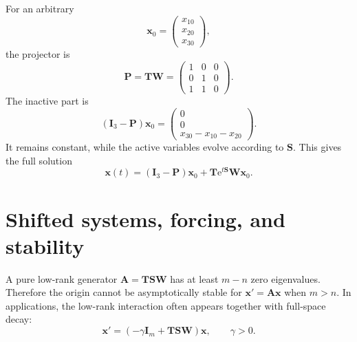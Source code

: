 \documentclass[11pt]{article}
\newcommand{\I}{\mathbf{I}}
\newcommand{\mat}[1]{\mathbf{#1}}
\newcommand{\vect}[1]{\mathbf{#1}}
\newcommand{\e}{\mathrm{e}}
\theoremstyle{definition}
\theoremstyle{remark}
\begin{document}
For an arbitrary
\[
  \vect{x}_0=
  \begin{pmatrix}x_{10}\\x_{20}\\x_{30}\end{pmatrix},
\]
the projector is
\begin{equation}
  \mat{P}=\mat{T}\mat{W}
  =
  \begin{pmatrix}
    1&0&0\\
    0&1&0\\
    1&1&0
  \end{pmatrix}.
  \label{eq:ode-example-P}
\end{equation}
The inactive part is
\begin{equation}
  (\I_3-\mat{P})\vect{x}_0
  =
  \begin{pmatrix}
    0\\0\\x_{30}-x_{10}-x_{20}
  \end{pmatrix}.
  \label{eq:ode-example-inactive}
\end{equation}
It remains constant, while the active variables evolve according to \(\mat{S}\). This gives the full solution
\begin{equation}
  \vect{x}(t)
  =(\I_3-\mat{P})\vect{x}_0
  +\mat{T}\e^{t\mat{S}}\mat{W}\vect{x}_0.
  \label{eq:ode-example-general-solution}
\end{equation}

\section{Shifted systems, forcing, and stability}
\label{sec:shifted-stability}

A pure low-rank generator \(\mat{A}=\mat{T}\mat{S}\mat{W}\) has at least \(m-n\) zero eigenvalues. Therefore the origin cannot be asymptotically stable for
\(\vect{x}'=\mat{A}\vect{x}\) when \(m>n\). In applications, the low-rank interaction often appears together with full-space decay:
\begin{equation}
  \vect{x}'
  =(-\gamma\I_m+\mat{T}\mat{S}\mat{W})\vect{x},
  \qquad \gamma>0.
  \label{eq:shifted-ode}
\end{equation}
\end{document}
